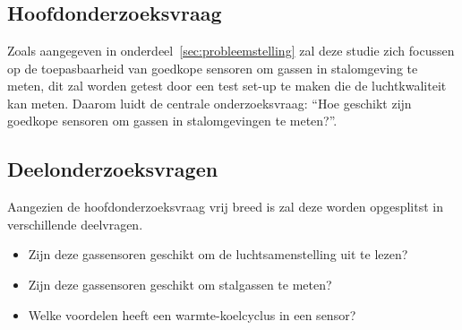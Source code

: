 \section{}%
\label{sec:onderzoeksvraag}

\subsection{Hoofdonderzoeksvraag}%
Zoals aangegeven in onderdeel~\ref{sec:probleemstelling} zal deze studie zich focussen op de toepasbaarheid van goedkope sensoren om gassen in stalomgeving te meten, dit zal worden getest door een test set-up te maken die de luchtkwaliteit kan meten. Daarom luidt de centrale onderzoeksvraag: ``Hoe geschikt zijn goedkope sensoren om gassen in stalomgevingen te meten?''.

\subsection{Deelonderzoeksvragen}%
Aangezien de hoofdonderzoeksvraag vrij breed is zal deze worden opgesplitst in verschillende deelvragen.

\begin{itemize}
    \item Zijn deze gassensoren geschikt om de luchtsamenstelling uit te lezen?
    \item Zijn deze gassensoren geschikt om stalgassen te meten?
    \item Welke voordelen heeft een warmte-koelcyclus in een sensor?
\end{itemize}


\section{}%
\label{sec:onderzoeksdoelstelling}


